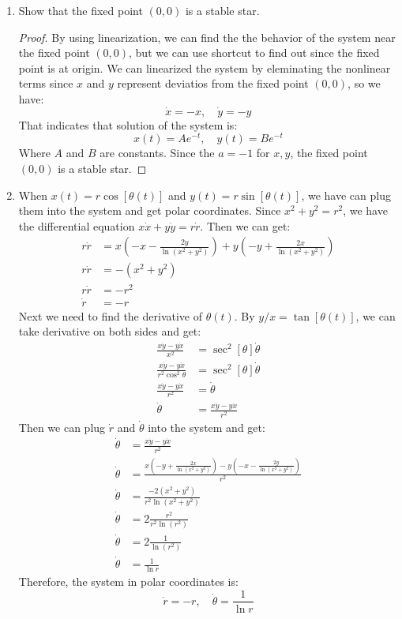 \documentclass[12pt]{exam}
\begin{document}
\begin{enumerate}
	\item Show that the fixed point $(0,0)$ is a stable star.
		\begin{proof}
			By using linearization, we can find the the behavior of the system near the fixed point $(0,0)$, but we can use shortcut to find out since the fixed point is at origin. We can linearized the system by eleminating the nonlinear terms since $x$ and $y$ represent deviatios from the fixed point $(0,0)$, so we have:
			\[ \dot{x} = -x, \quad \dot{y} = -y \]
			That indicates that solution of the system is:
			\[ x(t) = Ae^{-t}, \quad y(t) = Be^{-t} \]
			Where $A$ and $B$ are constants. Since the $a=-1$ for $x,y$, the fixed point $(0,0)$ is a stable star.
		\end{proof}

\item When $x(t)=r\cos[\theta(t)]$ and $y(t)=r\sin[\theta(t)]$, we have can plug them into the system and get polar coordinates. Since $x^2+y^2=r^2$, we have the differential equation $x\dot{x}+y\dot{y}=r\dot{r}$. Then we can get:
				\begin{align*}
					r\dot{r} &= x(-x-\frac{2y}{\ln(x^2+y^2)})+y(-y+\frac{2x}{\ln(x^2+y^2)}) \\
					r\dot{r} &= -(x^2+y^2) \\
					r\dot{r} &= -r^2 \\
					\dot{r} &= -r
				\end{align*}
	Next we need to find the derivative of $\theta(t)$. By $y/x=\tan[\theta(t)]$, we can take derivative on both sides and get:
	\begin{align*}
		\frac{x\dot{y}-y\dot{x}}{x^2} &= \sec^2[\theta]\dot{\theta} \\
		\frac{x\dot{y}-y\dot{x}}{r^2\cos^{2}\theta} &= \sec^2[\theta]\dot{\theta} \\
		\frac{x\dot{y}-y\dot{x}}{r^2} &= \dot{\theta} \\
		\dot{\theta} &= \frac{x\dot{y}-y\dot{x}}{r^2}
	\end{align*}
	Then we can plug $\dot{r}$ and $\dot{\theta}$ into the system and get:
	   \begin{align*}
						 \dot{\theta} &= \frac{x\dot{y}-y\dot{x}}{r^2} \\
						 \dot{\theta} &= \frac{x(-y+\frac{2x}{\ln(x^2+y^2)})-y(-x-\frac{2y}{\ln(x^2+y^2)})}{r^2} \\
						 \dot{\theta} &= \frac{-2(x^2+y^2)}{r^2\ln(x^2+y^2)} \\
						 \dot{\theta} &= 2\frac{r^2}{r^2\ln(r^2)} \\
						 \dot{\theta} &= 2\frac{1}{\ln(r^2)} \\
						 \dot{\theta} &= \frac{1}{\ln r}
		\end{align*}
	Therefore, the system in polar coordinates is:
	\[ \dot{r} = -r, \quad \dot{\theta} = \frac{1}{\ln r} \]
	

\end{enumerate}
\end{document}
